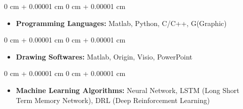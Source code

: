 \documentclass[10pt, letterpaper]{article}
\newenvironment{highlights}{
    \begin{itemize}[
        topsep=0.10 cm,
        parsep=0.10 cm,
        partopsep=0pt,
        itemsep=0pt,
        leftmargin=0 cm + 10pt
    ]
}{
    \end{itemize}
} %
\newenvironment{onecolentry}{
    \begin{adjustwidth}{
        0 cm + 0.00001 cm
    }{
        0 cm + 0.00001 cm
    }
}{
    \end{adjustwidth}
} %
\begin{document}
        \vspace{0.1 cm}

        \begin{onecolentry}
        \begin{highlights}
           \item \textbf{Programming Languages:} Matlab, Python, C/C++, G(Graphic)
        \end{highlights}
        \end{onecolentry}

        \vspace{0.1 cm}
        
        \begin{onecolentry}
        \begin{highlights}
           \item \textbf{Drawing Softwares:} Matlab, Origin, Visio, PowerPoint
        \end{highlights}
        \end{onecolentry}

        \vspace{0.1 cm}

        \begin{onecolentry}
        \begin{highlights}
           \item \textbf{Machine Learning Algorithms:} Neural Network, LSTM (Long Short Term Memory Network), DRL (Deep Reinforcement Learning)
        \end{highlights}
        \end{onecolentry}
\end{document}
